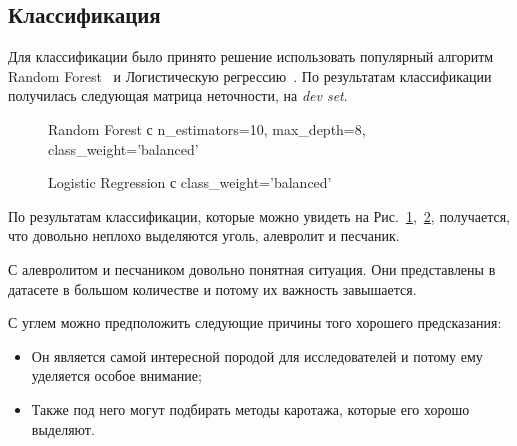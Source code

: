 \documentclass[aps,%
12pt,%
final,%
oneside,
onecolumn,%
musixtex, %
superscriptaddress,%
centertags]{article} %
\begin{document}
\subsection{Классификация}
Для классификации было принято решение использовать популярный алгоритм Random Forest~\cite{RandomForest} и Логистическую регрессию~\cite{LogisticRegression}. По результатам классификации получилась следующая матрица неточности, на \textit{dev set}.

\begin{figure}[h!]
\center
  \caption{Random Forest с n\_estimators=10, max\_depth=8, class\_weight='balanced'}
  \label{Random Forest clf}
\end{figure}

\begin{figure}[h!]
\center
  \caption{Logistic Regression с class\_weight='balanced'}
  \label{Logistic Regression clf}
\end{figure}

По результатам классификации, которые можно увидеть на Рис.~\ref{Random Forest clf},~\ref{Logistic Regression clf}, получается, что довольно неплохо выделяются уголь, алевролит и песчаник.

С алевролитом и песчаником довольно понятная ситуация. Они представлены в датасете в большом количестве и потому их важность завышается.

С углем можно предположить следующие причины того хорошего предсказания:
\begin{itemize}
  \item Он является самой интересной породой для исследователей и потому ему уделяется особое внимание;
  \item Также под него могут подбирать методы каротажа, которые его хорошо выделяют.
\end{itemize}
\end{document}

